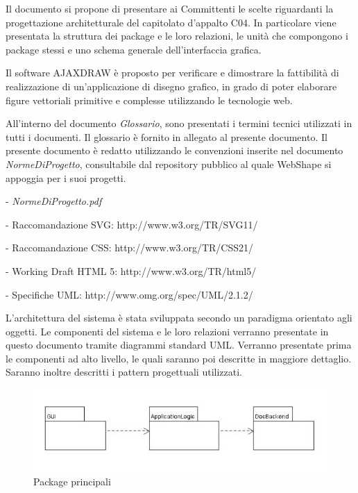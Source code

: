 
Il documento si propone di presentare ai Committenti le scelte riguardanti la progettazione architetturale del capitolato d'appalto C04. In particolare viene presentata la struttura dei package e le loro relazioni, le unit\`a che compongono i package stessi e uno schema generale dell'interfaccia grafica.

Il software AJAXDRAW \`e proposto per verificare e dimostrare la fattibilit\`a di realizzazione di un'applicazione di disegno grafico, in grado di poter elaborare figure vettoriali primitive e complesse utilizzando le tecnologie web.

All'interno del documento \textit{Glossario}, sono presentati i termini tecnici utilizzati in tutti i documenti. Il glossario \`e fornito in allegato al presente documento.
Il presente documento \`e redatto utilizzando le convenzioni inserite nel documento \textit{NormeDiProgetto}, consultabile dal repository pubblico al quale WebShape si appoggia per i suoi progetti.
\begin{elencopuntato}[\subsubsecindent]
\item[-] \textit{NormeDiProgetto.pdf}
\item[-] Raccomandazione SVG: http://www.w3.org/TR/SVG11/
\item[-] Raccomandazione CSS: http://www.w3.org/TR/CSS21/
\item[-] Working Draft HTML 5: http://www.w3.org/TR/html5/
\item[-] Specifiche UML: http://www.omg.org/spec/UML/2.1.2/
\end{elencopuntato}

L'architettura del sistema \`e stata sviluppata secondo un paradigma orientato agli oggetti. Le componenti del sistema e le loro relazioni verranno presentate in questo documento tramite diagrammi standard UML. Verranno presentate prima le componenti ad alto livello, le quali saranno poi descritte in maggiore dettaglio. Saranno inoltre descritti i pattern progettuali utilizzati.

\begin{figure}[!ht]
\centering
\includegraphics{MainView.jpg}
\caption{Package principali}
\end{figure}

